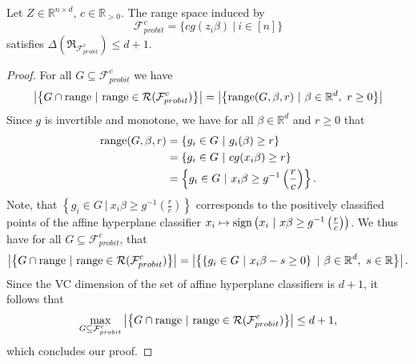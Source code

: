 \begin{lemma}
    Let $Z \in \mathbb{R}^{n \times d}$, $c \in \mathbb{R}_{>0}$.
    The range space induced by
    $$\mathcal{F}^c_{probit} = \{ c g(z_i \beta) \ | \ i \in [n] \}$$
    satisfies $\Delta(\mathfrak{R}_{\mathcal{F}^c_{probit}}) \leq d + 1$.
\end{lemma}
\begin{proof}
    For all $G \subseteq \mathcal{F}^c_{probit}$ we have
    \begin{equation*}
        \left| \left\{ G \cap \textup{range} \ | \
        \textup{range} \in \mathcal{R}(\mathcal{F}^c_{probit}) \right\} \right|
        =
        \left| \left\{ \textup{range}(G, \beta, r) \ | \
        \beta \in \mathbb{R}^d, \ r \geq 0 \right\} \right|
    \end{equation*}
    Since $g$ is invertible and monotone, we have for all
    $\beta \in \mathbb{R}^d$ and $r \geq 0$ that
    \begin{align*}
        \textup{range}(G, \beta, r)
         & = \left\{ g_i \in G \ |\ g_i(\beta) \geq r \right\}                                 \\
         & = \left\{ g_i \in G \ |\ c g(x_i \beta) \geq r \right\}                             \\
         & = \left\{ g_i \in G \ |\ x_i \beta \geq g^{-1} \left( \frac{r}{c} \right) \right\}.
    \end{align*}
    Note, that $\left\{ g_i \in G
        \ |\ x_i \beta \geq g^{-1} \left( \frac{r}{c} \right) \right\}$
    corresponds to the positively classified points of the
    affine hyperplane classifier
    $x_i \mapsto \textup{sign}\left( x_i\
        |\ x\beta \geq g^{-1}\left(\frac{r}{c}\right) \right)$.
    We thus have for all $G \subseteq \mathcal{F}_{probit}^c$, that
    \begin{equation*}
        \left| \left\{ G \cap \textup{range} \ | \
        \textup{range} \in \mathcal{R}(\mathcal{F}^c_{probit}) \right\} \right|
        =
        \left| \left\{ \left\{ g_i \in G
        \ |\ x_i \beta - s \geq 0 \right\} \ | \
        \beta \in \mathbb{R}^d, \ s \in \mathbb{R} \right\} \right|.
    \end{equation*}
    Since the VC dimension of the set of affine hyperplane classifiers is
    $d+1$, it follows that
    \begin{equation*}
        \max_{G \subseteq \mathcal{F}_{probit}^c}
        \left| \left\{ G \cap \textup{range} \ | \
        \textup{range} \in \mathcal{R}(\mathcal{F}^c_{probit}) \right\} \right|
        \leq d + 1,
    \end{equation*}
    which concludes our proof.
\end{proof}

